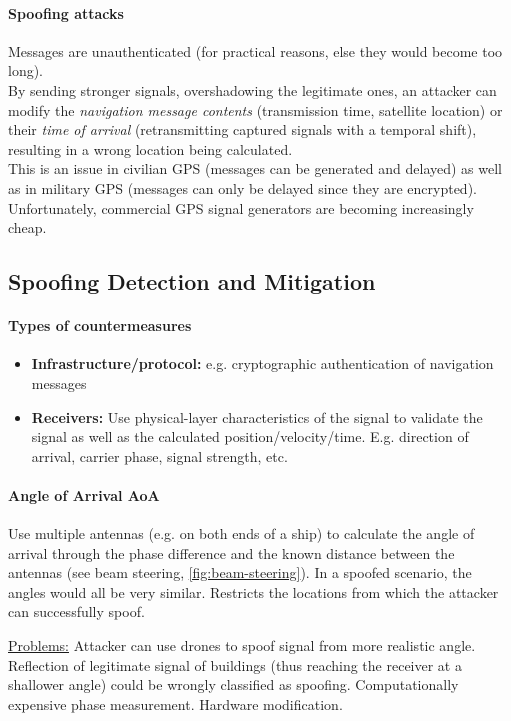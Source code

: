 \paragraph{Spoofing attacks}
Messages are unauthenticated (for practical reasons, else they would become too long).
\\
By sending stronger signals, overshadowing the legitimate ones, an attacker can modify the \textit{navigation message contents} (transmission time, satellite location) or their \textit{time of arrival} (retransmitting captured signals with a temporal shift), resulting in a wrong location being calculated.
\\
This is an issue in civilian GPS (messages can be generated and delayed) as well as in military GPS (messages can only be delayed since they are encrypted).
Unfortunately, commercial GPS signal generators are becoming increasingly cheap.


\subsection{Spoofing Detection and Mitigation}\label{sec:gps-spoof}

\paragraph{Types of countermeasures}
\begin{itemize}
	\item \textbf{Infrastructure/protocol:} e.g. cryptographic authentication of navigation messages
	\item \textbf{Receivers:}
	Use physical-layer characteristics of the signal to validate the signal as well as the calculated position/velocity/time.
	E.g. direction of arrival, carrier phase, signal strength, etc.
\end{itemize}

\paragraph{Angle of Arrival AoA}
Use multiple antennas (e.g. on both ends of a ship) to calculate the angle of arrival through the phase difference and the known distance between the antennas (see beam steering, \autoref{fig:beam-steering}).
In a spoofed scenario, the angles would all be very similar.
Restricts the locations from which the attacker can successfully spoof.

\underline{Problems:}
Attacker can use drones to spoof signal from more realistic angle.
Reflection of legitimate signal of buildings (thus reaching the receiver at a shallower angle) could be wrongly classified as spoofing.
Computationally expensive phase measurement.
Hardware modification.

